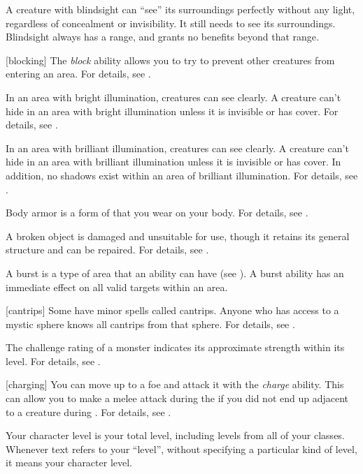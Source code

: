  A creature with blindsight can ``see'' its surroundings perfectly without any light, regardless of concealment or invisibility.
It still needs  to see its surroundings.
Blindsight always has a range, and grants no benefits beyond that range.

[blocking] The \textit{block} ability allows you to try to prevent other creatures from entering an area.
For details, see .

 In an area with bright illumination, creatures can see clearly.
A creature can't hide in an area with bright illumination unless it is invisible or has cover.
For details, see .

 In an area with brilliant illumination, creatures can see clearly.
A creature can't hide in an area with brilliant illumination unless it is invisible or has cover.
In addition, no shadows exist within an area of brilliant illumination.
For details, see .

 Body armor is a form of  that you wear on your body.
For details, see .

 A broken object is damaged and unsuitable for use, though it retains its general structure and can be repaired.
For details, see .

 A burst is a type of area that an ability can have (see ).
A burst ability has an immediate effect on all valid targets within an area.

[cantrips] Some  have minor spells called cantrips.
Anyone who has access to a mystic sphere knows all cantrips from that sphere.
For details, see .

 The challenge rating of a monster indicates its approximate strength within its level.
For details, see .

[charging] You can move up to a foe and attack it with the \textit{charge} ability.
This can allow you to make a melee attack during the  if you did not end up adjacent to a creature during .
For details, see .

 Your character level is your total level, including levels from all of your classes.
Whenever text refers to your ``level'', without specifying a particular kind of level, it means your character level.

